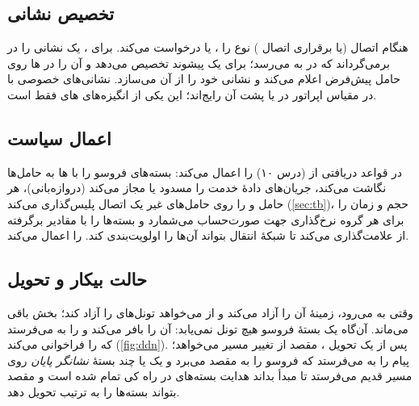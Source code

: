 \documentclass[11pt,a4paper]{article}
\begin{document}
\subsection{تخصیص نشانی }
هنگام اتصال (یا برقراری اتصال )  نوع  را ،  یا  درخواست می‌کند.
برای ،  یک نشانی را در  برمی‌گرداند که در  به  می‌رسد؛ برای
 یک پیشوند  تخصیص می‌دهد و آن را در ها روی حامل پیش‌فرض اعلام می‌کند و 
نشانی خود را از آن می‌سازد. نشانی‌های خصوصی  با  در مقیاس اپراتور در  یا پشت آن رایج‌اند؛
این یکی از انگیزه‌های های فقط  است.

\subsection{اعمال سیاست}
 در  قواعد  دریافتی از  (درس ۱۰) را اعمال می‌کند: بسته‌های فروسو را با ها به
حامل‌ها نگاشت می‌کند، جریان‌های دادهٔ خدمت را مسدود یا مجاز می‌کند (دروازه‌بانی)،  هر حامل و
 را روی حامل‌های غیر یک اتصال  پلیس‌گذاری می‌کند (\cref{sec:tb})، حجم و زمان را برای هر
گروه نرخ‌گذاری جهت صورت‌حساب می‌شمارد و بسته‌ها را با مقادیر  برگرفته از  علامت‌گذاری می‌کند تا شبکهٔ
انتقال بتواند آن‌ها را اولویت‌بندی کند.  را  اعمال می‌کند.

\subsection{حالت بیکار و تحویل}
وقتی  به  می‌رود،  زمینهٔ آن را آزاد می‌کند و  از  می‌خواهد تونل‌های
 را آزاد کند؛ بخش  باقی می‌ماند. آن‌گاه یک بستهٔ فروسو هیچ تونل  نمی‌یابد:  آن را بافر
می‌کند و  را به  می‌فرستد که  را فراخوانی می‌کند (\cref{fig:ddn}). پس از یک تحویل ،
 مقصد از  تغییر مسیر می‌خواهد؛  پیام  را به  می‌فرستد که
فروسو را به  مقصد می‌برد و یک یا چند بستهٔ \emph{نشانگر پایان} روی مسیر قدیم می‌فرستد تا  مبدأ بداند
هدایت بسته‌های در راه کی تمام شده است و مقصد بتواند بسته‌ها را به ترتیب تحویل دهد.
\end{document}
